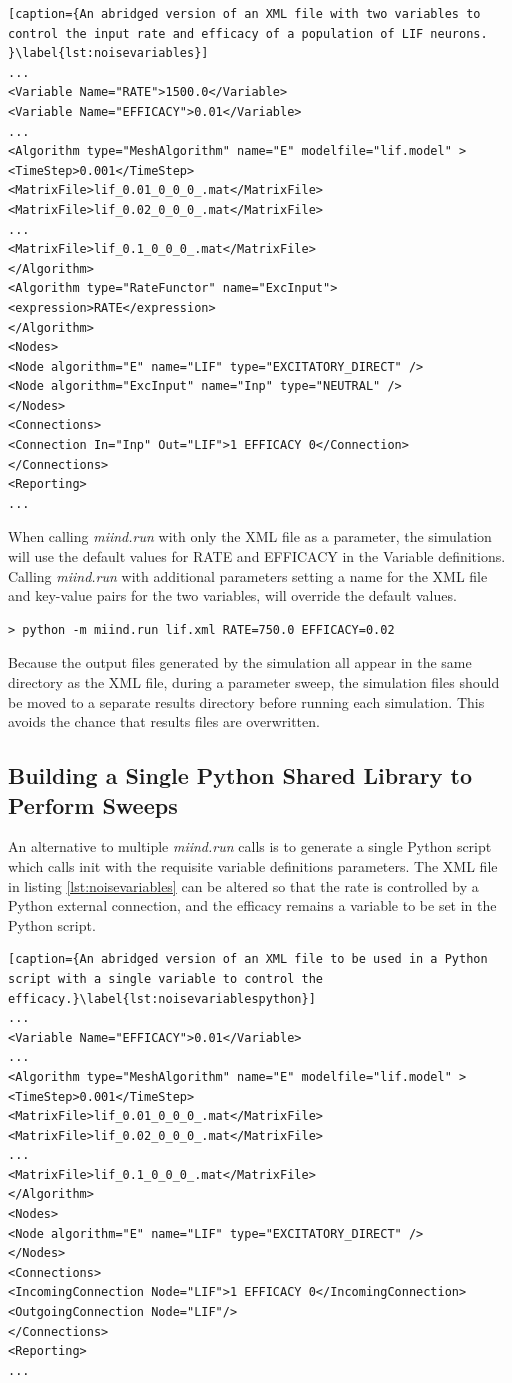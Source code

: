 \documentclass[utf8]{frontiers_suppmat} %
\begin{document}
\begin{lstlisting}[caption={An abridged version of an XML file with two variables to control the input rate and efficacy of a population of LIF neurons.  }\label{lst:noisevariables}]
...
<Variable Name="RATE">1500.0</Variable>
<Variable Name="EFFICACY">0.01</Variable>
...
<Algorithm type="MeshAlgorithm" name="E" modelfile="lif.model" >
<TimeStep>0.001</TimeStep>
<MatrixFile>lif_0.01_0_0_0_.mat</MatrixFile>
<MatrixFile>lif_0.02_0_0_0_.mat</MatrixFile>
...
<MatrixFile>lif_0.1_0_0_0_.mat</MatrixFile>
</Algorithm>
<Algorithm type="RateFunctor" name="ExcInput">
<expression>RATE</expression>
</Algorithm>
<Nodes>
<Node algorithm="E" name="LIF" type="EXCITATORY_DIRECT" />
<Node algorithm="ExcInput" name="Inp" type="NEUTRAL" />
</Nodes>
<Connections>
<Connection In="Inp" Out="LIF">1 EFFICACY 0</Connection>
</Connections>
<Reporting>
...
\end{lstlisting}

When calling \textit{miind.run} with only the XML file as a parameter, the simulation will use the default values for RATE and EFFICACY in the Variable definitions. Calling \textit{miind.run} with additional parameters setting a name for the XML file and key-value pairs for the two variables, will override the default values.

\begin{lstlisting}
> python -m miind.run lif.xml RATE=750.0 EFFICACY=0.02
\end{lstlisting}

Because the output files generated by the simulation all appear in the same directory as the XML file, during a parameter sweep, the simulation files should be moved to a separate results directory before running each simulation. This avoids the chance that results files are overwritten.\\

\subsection{Building a Single Python Shared Library to Perform Sweeps}
An alternative to multiple \textit{miind.run} calls is to generate a single Python script which calls init with the requisite variable definitions parameters. The XML file in listing \ref{lst:noisevariables} can be altered so that the rate is controlled by a Python external connection, and the efficacy remains a variable to be set in the Python script.

\begin{lstlisting}[caption={An abridged version of an XML file to be used in a Python script with a single variable to control the efficacy.}\label{lst:noisevariablespython}]
...
<Variable Name="EFFICACY">0.01</Variable>
...
<Algorithm type="MeshAlgorithm" name="E" modelfile="lif.model" >
<TimeStep>0.001</TimeStep>
<MatrixFile>lif_0.01_0_0_0_.mat</MatrixFile>
<MatrixFile>lif_0.02_0_0_0_.mat</MatrixFile>
...
<MatrixFile>lif_0.1_0_0_0_.mat</MatrixFile>
</Algorithm>
<Nodes>
<Node algorithm="E" name="LIF" type="EXCITATORY_DIRECT" />
</Nodes>
<Connections>
<IncomingConnection Node="LIF">1 EFFICACY 0</IncomingConnection>
<OutgoingConnection Node="LIF"/>
</Connections>
<Reporting>
...
\end{lstlisting}
\end{document}
